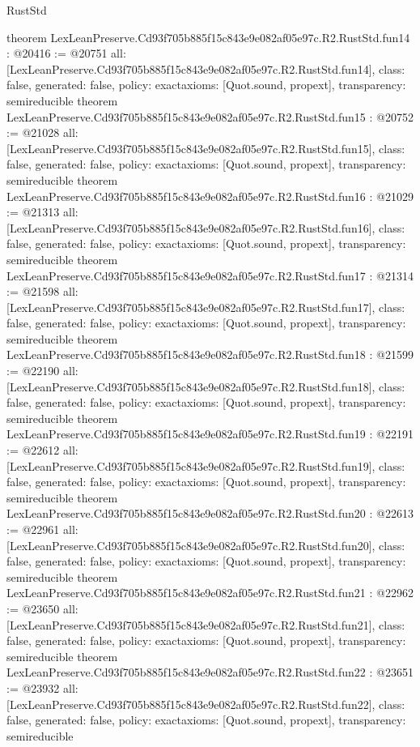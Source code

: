 \begin{lexlean}{RustStd}
\begin{coremodule}
{}
theorem LexLeanPreserve.Cd93f705b885f15c843e9e082af05e97c.R2.RustStd.fun14 : @20416 := @20751 {
  all: [LexLeanPreserve.Cd93f705b885f15c843e9e082af05e97c.R2.RustStd.fun14],
  class: false,
  generated: false,
  policy: exact{axioms: [Quot.sound, propext]},
  transparency: semireducible
}
theorem LexLeanPreserve.Cd93f705b885f15c843e9e082af05e97c.R2.RustStd.fun15 : @20752 := @21028 {
  all: [LexLeanPreserve.Cd93f705b885f15c843e9e082af05e97c.R2.RustStd.fun15],
  class: false,
  generated: false,
  policy: exact{axioms: [Quot.sound, propext]},
  transparency: semireducible
}
theorem LexLeanPreserve.Cd93f705b885f15c843e9e082af05e97c.R2.RustStd.fun16 : @21029 := @21313 {
  all: [LexLeanPreserve.Cd93f705b885f15c843e9e082af05e97c.R2.RustStd.fun16],
  class: false,
  generated: false,
  policy: exact{axioms: [Quot.sound, propext]},
  transparency: semireducible
}
theorem LexLeanPreserve.Cd93f705b885f15c843e9e082af05e97c.R2.RustStd.fun17 : @21314 := @21598 {
  all: [LexLeanPreserve.Cd93f705b885f15c843e9e082af05e97c.R2.RustStd.fun17],
  class: false,
  generated: false,
  policy: exact{axioms: [Quot.sound, propext]},
  transparency: semireducible
}
theorem LexLeanPreserve.Cd93f705b885f15c843e9e082af05e97c.R2.RustStd.fun18 : @21599 := @22190 {
  all: [LexLeanPreserve.Cd93f705b885f15c843e9e082af05e97c.R2.RustStd.fun18],
  class: false,
  generated: false,
  policy: exact{axioms: [Quot.sound, propext]},
  transparency: semireducible
}
theorem LexLeanPreserve.Cd93f705b885f15c843e9e082af05e97c.R2.RustStd.fun19 : @22191 := @22612 {
  all: [LexLeanPreserve.Cd93f705b885f15c843e9e082af05e97c.R2.RustStd.fun19],
  class: false,
  generated: false,
  policy: exact{axioms: [Quot.sound, propext]},
  transparency: semireducible
}
theorem LexLeanPreserve.Cd93f705b885f15c843e9e082af05e97c.R2.RustStd.fun20 : @22613 := @22961 {
  all: [LexLeanPreserve.Cd93f705b885f15c843e9e082af05e97c.R2.RustStd.fun20],
  class: false,
  generated: false,
  policy: exact{axioms: [Quot.sound, propext]},
  transparency: semireducible
}
theorem LexLeanPreserve.Cd93f705b885f15c843e9e082af05e97c.R2.RustStd.fun21 : @22962 := @23650 {
  all: [LexLeanPreserve.Cd93f705b885f15c843e9e082af05e97c.R2.RustStd.fun21],
  class: false,
  generated: false,
  policy: exact{axioms: [Quot.sound, propext]},
  transparency: semireducible
}
theorem LexLeanPreserve.Cd93f705b885f15c843e9e082af05e97c.R2.RustStd.fun22 : @23651 := @23932 {
  all: [LexLeanPreserve.Cd93f705b885f15c843e9e082af05e97c.R2.RustStd.fun22],
  class: false,
  generated: false,
  policy: exact{axioms: [Quot.sound, propext]},
  transparency: semireducible
}
\end{coremodule}
\end{lexlean}

